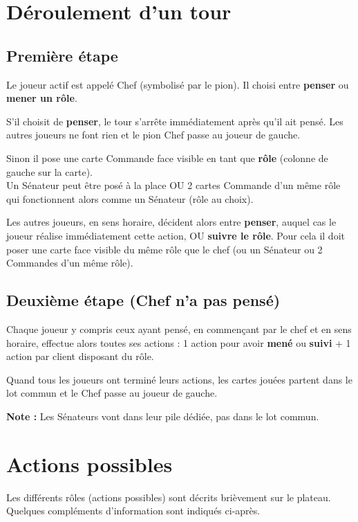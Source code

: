 \documentclass[10pt, a4paper]{article}	%
\begin{document}
\begin{multicols}{3}
\section{Déroulement d'un tour}
\subsection{Première étape}
Le joueur actif est appelé Chef (symbolisé par le pion).
Il choisi entre \textbf{penser} ou \textbf{mener un rôle}.

S'il choisit de \textbf{penser}, le tour s'arrête immédiatement après qu'il ait pensé. Les autres joueurs ne font rien et le pion \og Chef \fg{} passe au joueur de gauche.

Sinon il pose une carte Commande face visible en tant que \textbf{rôle} (colonne de gauche sur la carte).\\
Un Sénateur peut être posé à la place OU 2 cartes Commande d'un même rôle qui fonctionnent alors comme un Sénateur (rôle au choix).

\vspace{0.1cm}
Les autres joueurs, en sens horaire, décident alors entre \textbf{penser}, auquel cas le joueur réalise immédiatement cette action, OU \textbf{suivre le rôle}.
Pour cela il doit poser une carte face visible du même rôle que le chef (ou un Sénateur ou 2 Commandes d'un même rôle).

\subsection{Deuxième étape (Chef n'a pas pensé)}
Chaque joueur y compris ceux ayant pensé, en commençant par le chef et en sens horaire, effectue alors toutes ses actions : 1 action pour avoir \textbf{mené} ou \textbf{suivi} + 1 action par client disposant du rôle.

\vspace{0.1cm}
Quand tous les joueurs ont terminé leurs actions, les cartes jouées partent dans le lot commun et le Chef passe au joueur de gauche.

\textbf{Note :} Les Sénateurs vont dans leur pile dédiée, pas dans le lot commun.



\section{Actions possibles}
Les différents rôles (actions possibles) sont décrits brièvement sur le plateau.\\
Quelques compléments d'information sont indiqués ci-après.


\end{multicols}
\end{document}
